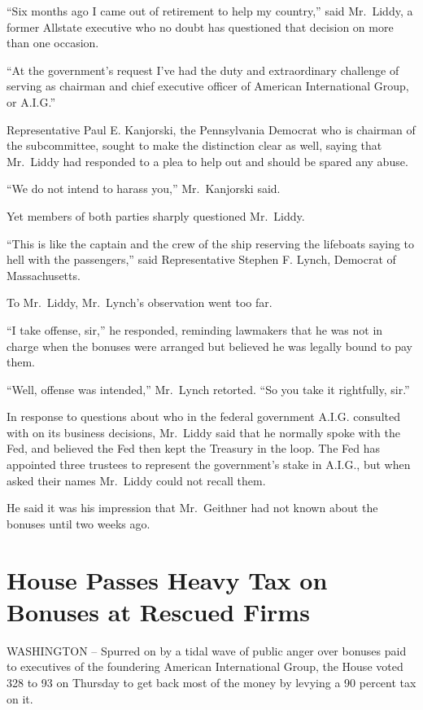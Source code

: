 \documentclass[12pt,a4paper,onecolumn]{article}
\begin{document}
\begin{CJK*}{GBK}{song}
``Six months ago I came out of retirement to help my country,'' said Mr.~Liddy, a former Allstate
executive who no doubt has questioned that decision on more than one occasion.

``At the government's request I've had the duty and extraordinary challenge of serving as chairman
and chief executive officer of American International Group, or A.I.G.''

Representative Paul E. Kanjorski, the Pennsylvania Democrat who is chairman of the subcommittee,
sought to make the distinction clear as well, saying that Mr.~Liddy had responded to a plea to help
out and should be spared any abuse.

``We do not intend to harass you,'' Mr.~Kanjorski said.

Yet members of both parties sharply questioned Mr.~Liddy.

``This is like the captain and the crew of the ship reserving the lifeboats saying to hell with the
passengers,'' said Representative Stephen F. Lynch, Democrat of Massachusetts.

To Mr.~Liddy, Mr.~Lynch's observation went too far.

``I take offense, sir,'' he responded, reminding lawmakers that he was not in charge when the
bonuses were arranged but believed he was legally bound to pay them.

``Well, offense was intended,'' Mr.~Lynch retorted. ``So you take it rightfully, sir.''

In response to questions about who in the federal government A.I.G. consulted with on its business
decisions, Mr.~Liddy said that he normally spoke with the Fed, and believed the Fed then kept the
Treasury in the loop. The Fed has appointed three trustees to represent the government's stake in
A.I.G., but when asked their names Mr.~Liddy could not recall them.

He said it was his impression that Mr.~Geithner had not known about the bonuses until two weeks ago.

\section{House Passes Heavy Tax on Bonuses at Rescued Firms}

WASHINGTON -- Spurred on by a tidal wave of public anger over bonuses paid to executives of the
foundering American International Group, the House voted 328 to 93 on Thursday to get back most of
the money by levying a 90 percent tax on it.


\end{CJK*}
\end{document}

